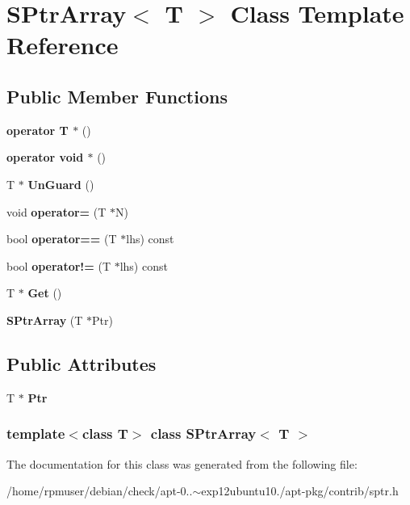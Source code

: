 \section{\-S\-Ptr\-Array$<$ \-T $>$ \-Class \-Template \-Reference}
\label{classSPtrArray}
\subsection*{\-Public \-Member \-Functions}
\begin{DoxyCompactItemize}
\item 
{\bfseries operator T $\ast$} ()\label{classSPtrArray_a4e20322854ce5d78776cdaf1a87aacd9}

\item 
{\bfseries operator void $\ast$} ()\label{classSPtrArray_a0b32021b12206ef34495c688760c44bf}

\item 
\-T $\ast$ {\bfseries \-Un\-Guard} ()\label{classSPtrArray_a138f89ea209d517d530b808e524125e1}

\item 
void {\bfseries operator=} (\-T $\ast$\-N)\label{classSPtrArray_a4f37889697348747d7432d0e8368a7fd}

\item 
bool {\bfseries operator==} (\-T $\ast$lhs) const \label{classSPtrArray_a8039659521ab9ef2bb9ab69befd8792a}

\item 
bool {\bfseries operator!=} (\-T $\ast$lhs) const \label{classSPtrArray_ad28d3ead733e4eb4aa84e9e1e686fd8d}

\item 
\-T $\ast$ {\bfseries \-Get} ()\label{classSPtrArray_a9381b54160045cd20c4246fc8d23da10}

\item 
{\bfseries \-S\-Ptr\-Array} (\-T $\ast$\-Ptr)\label{classSPtrArray_a413911271b0a3bf97001bc8c410ea255}

\end{DoxyCompactItemize}
\subsection*{\-Public \-Attributes}
\begin{DoxyCompactItemize}
\item 
\-T $\ast$ {\bfseries \-Ptr}\label{classSPtrArray_a89d6013a0fce85f8d86599a3d328aac0}

\end{DoxyCompactItemize}
\subsubsection*{template$<$class \-T$>$ class S\-Ptr\-Array$<$ T $>$}



\-The documentation for this class was generated from the following file\-:\begin{DoxyCompactItemize}
\item 
/home/rpmuser/debian/check/apt-\/0..$\sim$exp12ubuntu10./apt-\/pkg/contrib/sptr.\-h\end{DoxyCompactItemize}
